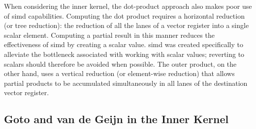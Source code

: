 \documentclass[\main/thesis.tex]{subfiles}
\begin{document}
When considering the inner kernel, the dot-product approach also makes poor use of \gls{simd} capabilities.
Computing the dot product requires a horizontal reduction (or tree reduction): the reduction of all the \glspl{lane} of a vector register into a single scalar element.
Computing a partial result in this manner reduces the effectiveness of \gls{simd} by creating a scalar value.
\Gls{simd} was created specifically to alleviate the bottleneck associated with working with scalar values; reverting to scalars should therefore be avoided when possible.
The outer product, on the other hand, uses a vertical reduction (or element-wise reduction) that allows partial products to be accumulated simultaneously in all \glspl{lane} of the destination vector register.

\subsection{Goto and van de Geijn in the Inner Kernel}
\end{document}
